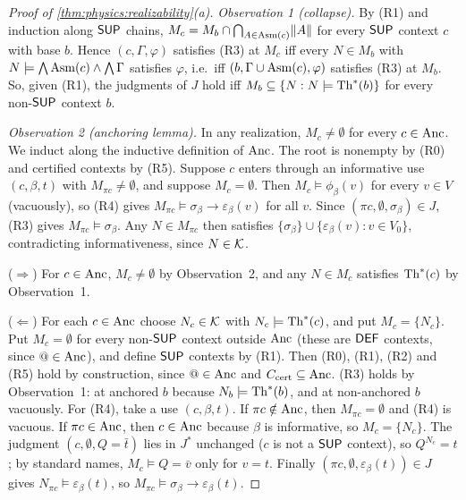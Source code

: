 \begin{proof}[Proof of \cref{thm:physics:realizability}(a)]
\emph{Observation 1 (collapse).} By (R1) and induction along $\mathsf{SUP}$ chains,
$M_c=M_b\cap\bigcap_{A\in\mathrm{Asm}(c)}\lVert A\rVert$ for every $\mathsf{SUP}$ context $c$ with base $b$. Hence
$(c,\Gamma,\varphi)$ satisfies (R3) at $M_c$ iff every $N\in M_b$ with
$N\models\bigwedge\mathrm{Asm}(c)\wedge\bigwedge\Gamma$ satisfies $\varphi$, i.e.\ iff
$(b,\Gamma\cup\mathrm{Asm}(c),\varphi)$ satisfies (R3) at $M_b$. So, given (R1), the judgments of $J$
hold iff $M_b\subseteq\{N:N\models\mathrm{Th}^*(b)\}$ for every non-$\mathsf{SUP}$ context $b$.

\emph{Observation 2 (anchoring lemma).} In any realization, $M_c\neq\emptyset$ for every
$c\in\mathrm{Anc}$. We induct along the inductive definition of $\mathrm{Anc}$. The root is nonempty by
(R0) and certified contexts by (R5). Suppose $c$ enters through an informative use
$(c,\beta,t)$ with $M_{\pi c}\neq\emptyset$, and suppose $M_c=\emptyset$. Then
$M_c\models\phi_\beta(v)$ for every $v\in V$ (vacuously), so (R4) gives
$M_{\pi c}\models\sigma_\beta\to\varepsilon_\beta(v)$ for all $v$. Since
$(\pi c,\emptyset,\sigma_\beta)\in J$, (R3) gives $M_{\pi c}\models\sigma_\beta$. Any
$N\in M_{\pi c}$ then satisfies $\{\sigma_\beta\}\cup\{\varepsilon_\beta(v):v\in V_0\}$,
contradicting informativeness, since $N\in\mathcal{K}$.

($\Rightarrow$) For $c\in\mathrm{Anc}$, $M_c\neq\emptyset$ by Observation~2, and any $N\in M_c$
satisfies $\mathrm{Th}^*(c)$ by Observation~1.

($\Leftarrow$) For each $c\in\mathrm{Anc}$ choose $N_c\in\mathcal{K}$ with $N_c\models\mathrm{Th}^*(c)$, and put
$M_c=\{N_c\}$. Put $M_c=\emptyset$ for every non-$\mathsf{SUP}$ context outside $\mathrm{Anc}$ (these are
$\mathsf{DEF}$ contexts, since $@\in\mathrm{Anc}$), and define $\mathsf{SUP}$ contexts by (R1). Then (R0), (R1),
(R2) and (R5) hold by construction, since $@\in\mathrm{Anc}$ and $C_{\mathrm{cert}}\subseteq\mathrm{Anc}$. (R3) holds by
Observation~1: at anchored $b$ because $N_b\models\mathrm{Th}^*(b)$, and at non-anchored $b$
vacuously. For (R4), take a use $(c,\beta,t)$. If $\pi c\notin\mathrm{Anc}$, then
$M_{\pi c}=\emptyset$ and (R4) is vacuous. If $\pi c\in\mathrm{Anc}$, then $c\in\mathrm{Anc}$ because
$\beta$ is informative, so $M_c=\{N_c\}$. The judgment $(c,\emptyset,Q=\bar t)$ lies in
$J^*$ unchanged ($c$ is not a $\mathsf{SUP}$ context), so $Q^{N_c}=t$; by standard names,
$M_c\models Q=\bar v$ only for $v=t$. Finally $(\pi c,\emptyset,\varepsilon_\beta(t))\in J$
gives $N_{\pi c}\models\varepsilon_\beta(t)$, so $M_{\pi c}\models\sigma_\beta\to\varepsilon_\beta(t)$.
\end{proof}

